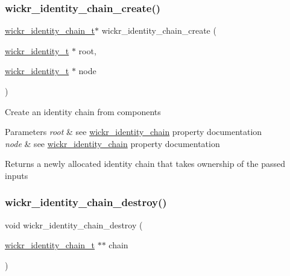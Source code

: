 \subsubsection{\texorpdfstring{wickr\+\_\+identity\+\_\+chain\+\_\+create()}{wickr\_identity\_chain\_create()}}
{\footnotesize\ttfamily \hyperlink{structwickr__identity__chain}{wickr\+\_\+identity\+\_\+chain\+\_\+t}$\ast$ wickr\+\_\+identity\+\_\+chain\+\_\+create (\begin{DoxyParamCaption}\item[{\hyperlink{structwickr__identity}{wickr\+\_\+identity\+\_\+t} $\ast$}]{root,  }\item[{\hyperlink{structwickr__identity}{wickr\+\_\+identity\+\_\+t} $\ast$}]{node }\end{DoxyParamCaption})}

Create an identity chain from components


\begin{DoxyParams}{Parameters}
{\em root} & see \textquotesingle{}\hyperlink{structwickr__identity__chain}{wickr\+\_\+identity\+\_\+chain}\textquotesingle{} property documentation \\
\hline
{\em node} & see \textquotesingle{}\hyperlink{structwickr__identity__chain}{wickr\+\_\+identity\+\_\+chain}\textquotesingle{} property documentation \\
\hline
\end{DoxyParams}
\begin{DoxyReturn}{Returns}
a newly allocated identity chain that takes ownership of the passed inputs 
\end{DoxyReturn}
\mbox{\label{group__wickr__identity_gadbddf6d49fddb2df103486970b3d564b}} 
\subsubsection{\texorpdfstring{wickr\+\_\+identity\+\_\+chain\+\_\+destroy()}{wickr\_identity\_chain\_destroy()}}
{\footnotesize\ttfamily void wickr\+\_\+identity\+\_\+chain\+\_\+destroy (\begin{DoxyParamCaption}\item[{\hyperlink{structwickr__identity__chain}{wickr\+\_\+identity\+\_\+chain\+\_\+t} $\ast$$\ast$}]{chain }\end{DoxyParamCaption})}

